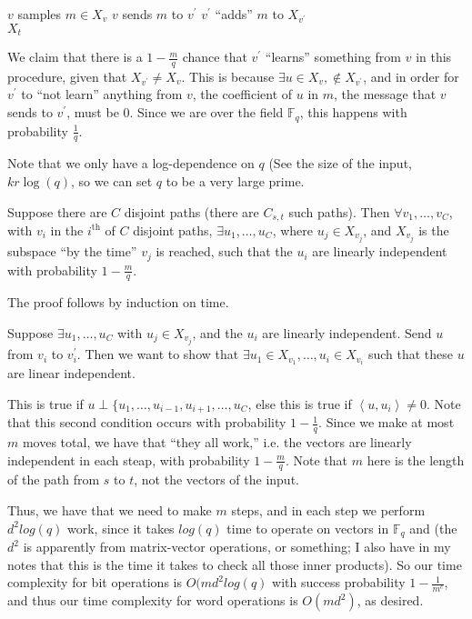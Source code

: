 \documentclass[11pt]{article}
\newcommand{\F}{\mathbb{F}}
\begin{document}
\begin{algorithm}[H]
\begin{algorithmic}
    \State $v$ samples $m \in X_v$
    \State $v$ sends $m$ to $v^\prime$
    \State $v^\prime$ ``adds'' $m$ to $X_{v^\prime}$
  \EndFor \\
  \Return $X_t$
\EndFunction
\end{algorithmic}
\end{algorithm}

We claim that there is a $1 - \frac{m}{q}$ chance that $v^\prime$ ``learns'' something from $v$ in this
procedure, given that $X_{v^\prime} \neq X_v$. This is because $\exists u\in X_v, \notin X_{v^\prime}$,
and in order for $v^\prime$ to ``not learn'' anything from $v$, the coefficient of $u$ in $m$, the message
that $v$ sends to $v^\prime$, must be 0. Since we are over the field $\F_q$, this happens with probability
$\frac{1}{q}$.

Note that we only have a log-dependence on $q$ (See the size of the input, $kr\log(q)$, so we can set
$q$ to be a very large prime.

Suppose there are $C$ disjoint paths (there are $C_{s,t}$ such paths). Then $\forall v_1, \ldots, v_C$,
with $v_i$ in the $i^{\text{th}}$ of $C$ disjoint paths, $\exists u_1, \ldots, u_C$, where $u_j \in X_{v_j}$,
and $X_{v_j}$ is the subspace ``by the time'' $v_j$ is reached, such that the $u_i$ are linearly independent
with probability $1 - \frac{m}{q}$.

The proof follows by induction on time.

Suppose $\exists u_1, \ldots, u_C$ with $u_j \in X_{v_j}$, and the $u_i$ are linearly independent.
Send $u$ from $v_i$ to $v_i^\prime$. Then we want to show that $\exists u_1 \in X_{v_1}, \ldots, u_i \in
X_{v_i}$ such that these $u$ are linear independent.

This is true if $u \perp \{u_1, \ldots, u_{i-1}, u_{i+1}, \ldots, u_C$, else this is true if
$\left<u, u_i\right> \neq 0$. Note that this second condition occurs with probability $1 - \frac{1}{q}$.
Since we make at most $m$ moves total, we have that ``they all work,'' i.e. the vectors are linearly
independent in each steap, with probability $1 - \frac{m}{q}$. Note that $m$ here is the length of the
path from $s$ to $t$, not the vectors of the input.

Thus, we have that we need to make $m$ steps, and in each step we perform $d^2log(q)$ work, since it
takes $log(q)$ time to operate on vectors in $\F_q$ and (the $d^2$ is apparently from matrix-vector operations,
or something; I also have in my notes that this is the time it takes to check all those inner products).
So our time complexity for bit operations is $O(md^2log(q)$ with success probability $1 - \frac{1}{m^c}$,
and thus our time complexity for word operations is $O(md^2)$, as desired.
\end{document}
